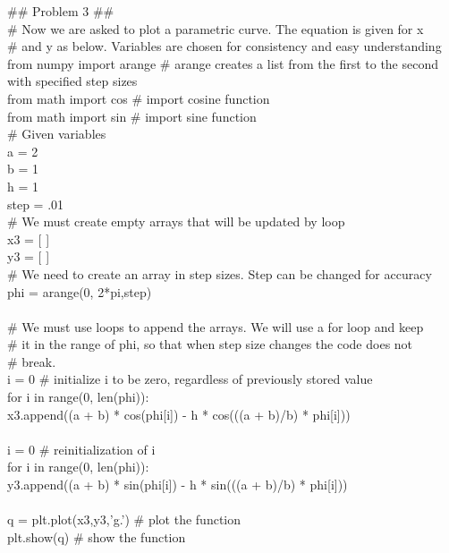 \documentclass[11pt]{article}   %
\begin{document}
\begin{tcolorbox}
   $\#$$\#$ Problem 3 $\#$$\#$\\
   $\#$ Now we are asked to plot a parametric curve.  The equation is given for x\\
   $\#$ and y as below.  Variables are chosen for consistency and easy understanding\\
   from numpy import arange   $\#$ arange creates a list from the first to the second with specified step sizes\\
   from math import cos       $\#$ import cosine function\\
   from math import sin       $\#$ import sine function\\
   $\#$ Given variables\\
   a = 2                      \\
   b = 1\\
   h = 1\\
   step = .01\\
   $\#$ We must create empty arrays that will be updated by loop\\
   x3 = [ ]\\
   y3 = [ ]\\
   $\#$ We need to create an array in step sizes.  Step can be changed for accuracy \\
   phi = arange(0, 2*pi,step)\\
\\
   $\#$ We must use loops to append the arrays.  We will use a for loop and keep\\
   $\#$ it in the range of phi, so that when step size changes the code does not\\
   $\#$ break.\\
   i = 0    $\#$ initialize i to be zero, regardless of previously stored value\\
   for i in range(0, len(phi)):  \\
      x3.append((a + b) * cos(phi[i]) - h * cos(((a + b)/b) * phi[i]))\\
\\
   i = 0    $\#$ reinitialization of i\\
   for i in range(0, len(phi)):\\
      y3.append((a + b) * sin(phi[i]) - h * sin(((a + b)/b) * phi[i]))\\
\\
   q = plt.plot(x3,y3,'g.')   $\#$ plot the function\\
   plt.show(q)                $\#$ show the function
\end{tcolorbox}
\end{document}
